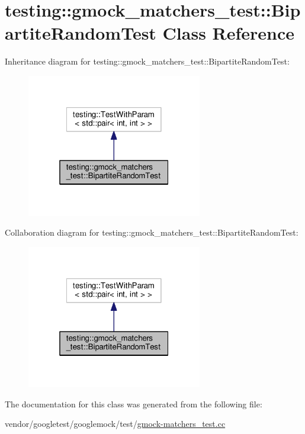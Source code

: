 \hypertarget{classtesting_1_1gmock__matchers__test_1_1BipartiteRandomTest}{}\section{testing\+:\+:gmock\+\_\+matchers\+\_\+test\+:\+:Bipartite\+Random\+Test Class Reference}
\label{classtesting_1_1gmock__matchers__test_1_1BipartiteRandomTest}


Inheritance diagram for testing\+:\+:gmock\+\_\+matchers\+\_\+test\+:\+:Bipartite\+Random\+Test\+:
\nopagebreak
\begin{figure}[H]
\begin{center}
\leavevmode
\includegraphics[width=217pt]{classtesting_1_1gmock__matchers__test_1_1BipartiteRandomTest__inherit__graph}
\end{center}
\end{figure}


Collaboration diagram for testing\+:\+:gmock\+\_\+matchers\+\_\+test\+:\+:Bipartite\+Random\+Test\+:
\nopagebreak
\begin{figure}[H]
\begin{center}
\leavevmode
\includegraphics[width=217pt]{classtesting_1_1gmock__matchers__test_1_1BipartiteRandomTest__coll__graph}
\end{center}
\end{figure}


The documentation for this class was generated from the following file\+:\begin{DoxyCompactItemize}
\item 
vendor/googletest/googlemock/test/\hyperlink{gmock-matchers__test_8cc}{gmock-\/matchers\+\_\+test.\+cc}\end{DoxyCompactItemize}
